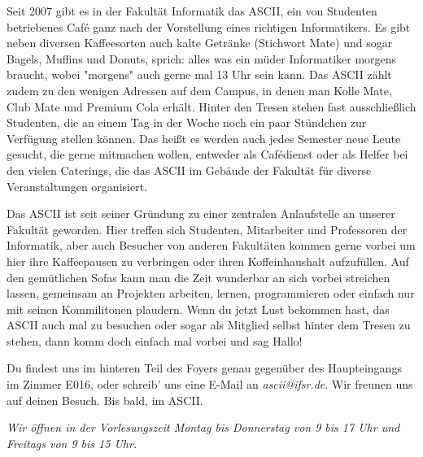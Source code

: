 

Seit 2007 gibt es in der Fakultät Informatik das ASCII, ein von Studenten betriebenes Café ganz nach der Vorstellung eines richtigen Informatikers.
Es gibt neben diversen Kaffeesorten auch kalte Getränke (Stichwort Mate) und sogar Bagels, Muffins und Donuts, sprich:
alles was ein müder Informatiker morgens braucht, wobei "morgens" auch gerne mal 13 Uhr sein kann.
Das ASCII zählt zudem zu den wenigen Adressen auf dem Campus, in denen man Kolle Mate, Club Mate und Premium Cola erhält.
Hinter den Tresen stehen fast ausschließlich Studenten, die an einem Tag in der Woche noch ein paar Stündchen zur Verfügung stellen können.
Das heißt es werden auch jedes Semester neue Leute gesucht, die gerne mitmachen wollen, entweder als Cafédienst oder als Helfer bei den vielen Caterings, die das ASCII im Gebäude der Fakultät für diverse Veranstaltungen organisiert.

Das ASCII ist seit seiner Gründung zu einer zentralen Anlaufstelle an unserer Fakultät geworden.
Hier treffen sich Studenten, Mitarbeiter und Professoren der Informatik, aber auch Besucher von anderen Fakultäten kommen gerne vorbei um hier ihre Kaffeepausen zu verbringen oder ihren Koffeinhaushalt aufzufüllen.
Auf den gemütlichen Sofas kann man die Zeit wunderbar an sich vorbei streichen lassen, gemeinsam an Projekten arbeiten, lernen, programmieren oder einfach nur mit seinen Kommilitonen plaudern.
Wenn du jetzt Lust bekommen hast, das ASCII auch mal zu besuchen oder sogar als Mitglied selbst hinter dem Tresen zu stehen, dann komm doch einfach mal vorbei und sag Hallo!

Du findest uns im hinteren Teil des Foyers genau gegenüber des Haupteingangs im Zimmer E016, oder schreib' uns eine E-Mail an \textit{ascii@ifsr.de}.
Wir freunen uns auf deinen Besuch.
Bis bald, im ASCII.

\textit{Wir öffnen in der Vorlesungszeit Montag bis Donnerstag von 9 bis 17 Uhr und Freitags von 9 bis 15 Uhr.}
